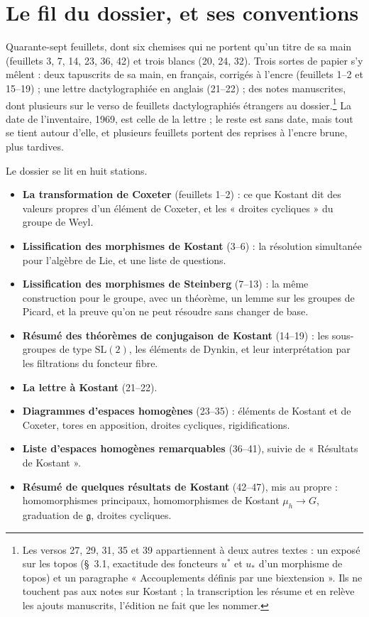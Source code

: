 \documentclass[11pt,a4paper]{article}
\begin{document}
\section*{Le fil du dossier, et ses conventions}

Quarante-sept feuillets, dont six chemises qui ne portent qu'un titre de sa main
(feuillets 3, 7, 14, 23, 36, 42) et trois blancs (20, 24, 32). Trois sortes de
papier s'y mêlent : deux tapuscrits de sa main, en français, corrigés à
l'encre (feuillets 1--2 et 15--19) ; une lettre dactylographiée en anglais
(21--22) ; des notes manuscrites, dont plusieurs sur le verso de feuillets
dactylographiés étrangers au dossier.\footnote{Les versos 27, 29, 31, 35 et 39
appartiennent à deux autres textes : un exposé sur les topos (§~3.1, exactitude
des foncteurs $u^{*}$ et $u_{*}$ d'un morphisme de topos) et un paragraphe
« Accouplements définis par une biextension ». Ils ne touchent pas aux notes sur
Kostant ; la transcription les résume et en relève les ajouts manuscrits,
l'édition ne fait que les nommer.} La date de l'inventaire, 1969, est celle de
la lettre ; le reste est sans date, mais tout se tient autour d'elle, et
plusieurs feuillets portent des reprises à l'encre brune, plus tardives.

Le dossier se lit en huit stations.

\begin{itemize}
\item \textbf{La transformation de Coxeter} (feuillets 1--2) : ce que Kostant
  dit des valeurs propres d'un élément de Coxeter, et les « droites
  cycliques » du groupe de Weyl.
\item \textbf{Lissification des morphismes de Kostant} (3--6) : la résolution
  simultanée pour l'algèbre de Lie, et une liste de questions.
\item \textbf{Lissification des morphismes de Steinberg} (7--13) : la même
  construction pour le groupe, avec un théorème, un lemme sur les groupes de
  Picard, et la preuve qu'on ne peut résoudre sans changer de base.
\item \textbf{Résumé des théorèmes de conjugaison de Kostant} (14--19) : les
  sous-groupes de type $\mathrm{SL}(2)$, les éléments de Dynkin, et leur
  interprétation par les filtrations du foncteur fibre.
\item \textbf{La lettre à Kostant} (21--22).
\item \textbf{Diagrammes d'espaces homogènes} (23--35) : éléments de Kostant
  et de Coxeter, tores en apposition, droites cycliques, rigidifications.
\item \textbf{Liste d'espaces homogènes remarquables} (36--41), suivie de
  « Résultats de Kostant ».
\item \textbf{Résumé de quelques résultats de Kostant} (42--47), mis au
  propre : homomorphismes principaux, homomorphismes de Kostant
  $\mu_{h}\to G$, graduation de $\mathfrak{g}$, droites cycliques.
\end{itemize}
\end{document}
